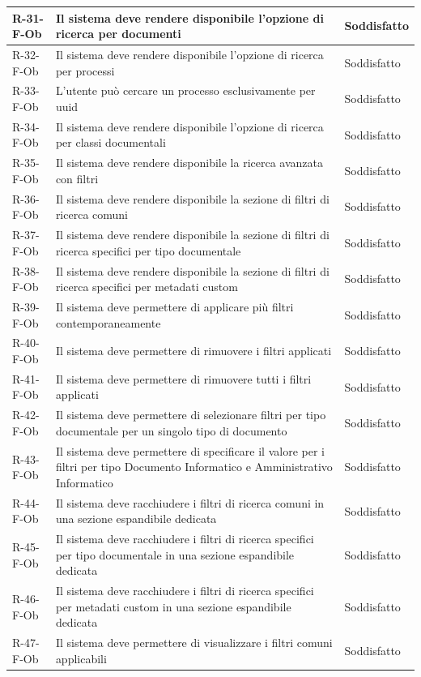\begin{longtable}{|p{2.5cm}|p{9.5cm}|p{2.5cm}|}
\hline
R-31-F-Ob & Il sistema deve rendere disponibile l'opzione di ricerca per documenti & Soddisfatto \\
\hline
R-32-F-Ob & Il sistema deve rendere disponibile l'opzione di ricerca per processi & Soddisfatto \\
\hline
R-33-F-Ob & L'utente può cercare un processo esclusivamente per uuid & Soddisfatto \\
\hline
R-34-F-Ob & Il sistema deve rendere disponibile l'opzione di ricerca per classi documentali & Soddisfatto \\
\hline
R-35-F-Ob & Il sistema deve rendere disponibile la ricerca avanzata con filtri & Soddisfatto \\
\hline
R-36-F-Ob & Il sistema deve rendere disponibile la sezione di filtri di ricerca comuni & Soddisfatto \\
\hline
R-37-F-Ob & Il sistema deve rendere disponibile la sezione di filtri di ricerca specifici per tipo documentale & Soddisfatto \\
\hline
R-38-F-Ob & Il sistema deve rendere disponibile la sezione di filtri di ricerca specifici per metadati custom & Soddisfatto \\
\hline
R-39-F-Ob & Il sistema deve permettere di applicare più filtri contemporaneamente & Soddisfatto \\
\hline
R-40-F-Ob & Il sistema deve permettere di rimuovere i filtri applicati & Soddisfatto \\
\hline
R-41-F-Ob & Il sistema deve permettere di rimuovere tutti i filtri applicati & Soddisfatto \\
\hline
R-42-F-Ob & Il sistema deve permettere di selezionare filtri per tipo documentale per un singolo tipo di documento & Soddisfatto \\
\hline
R-43-F-Ob & Il sistema deve permettere di specificare il valore per i filtri per tipo Documento Informatico e Amministrativo Informatico & Soddisfatto \\
\hline
R-44-F-Ob & Il sistema deve racchiudere i filtri di ricerca comuni in una sezione espandibile dedicata & Soddisfatto \\
\hline
R-45-F-Ob & Il sistema deve racchiudere i filtri di ricerca specifici per tipo documentale in una sezione espandibile dedicata & Soddisfatto \\
\hline
R-46-F-Ob & Il sistema deve racchiudere i filtri di ricerca specifici per metadati custom in una sezione espandibile dedicata & Soddisfatto \\
\hline
R-47-F-Ob & Il sistema deve permettere di visualizzare i filtri comuni applicabili & Soddisfatto \\

\end{longtable}
